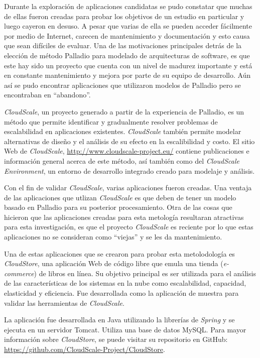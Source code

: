 \documentclass[11pt, twoside]{report}
\begin{document}
Durante la exploración de aplicaciones candidatas se pudo constatar que muchas de ellas fueron creadas para probar los objetivos de un estudio en particular y luego cayeron en desuso. A pesar que varias de ella se pueden acceder fácilmente por medio de Internet, carecen de mantenimiento y documentación y esto causa que sean difíciles de evaluar. Una de las motivaciones principales detrás de la elección de método Palladio para modelado de arquitecturas de software, es que este hay sido un proyecto que cuenta con un nivel de madurez importante y está en constante mantenimiento y mejora por parte de su equipo de desarrollo. Aún así se pudo encontrar aplicaciones que utilizaron modelos de Palladio pero se encontraban en ``abandono''. 

\emph{CloudScale}\cite{cloudscale-2}, un proyecto generado a partir de la experiencia de Palladio, es un método que permite identificar y gradualmente resolver problemas de escalabilidad en aplicaciones existentes. \emph{CloudScale} también permite modelar alternativas de diseño y el análisis de su efecto en la escalibilidad y costo\cite{cloudscale}. El sitio Web de \emph{CloudScale}, \url{http://www.cloudscale-project.eu/} contiene publicaciones e información general acerca de este método, así también como del \emph{CloudScale Environment}, un entorno de desarrollo integrado creado para modelaje y análisis. 

Con el fin de validar \emph{CloudScale}, varias aplicaciones fueron creadas. Una ventaja de las aplicaciones que utlizan \emph{CloudScale} es que deben de tener un modelo basado en Palladio para su posterior procesamiento. Otra de las cosas que hicieron que las aplicaciones creadas para esta metología resultaran atractivas para esta investigación, es que el proyecto \emph{CloudScale} es reciente por lo que estas aplicaciones no se consideran como ``viejas'' y se les da mantenimiento. 

Una de estas aplicaciones que se crearon para probar esta metolodología es \emph{CloudStore}, una aplicación Web de código libre que emula una tienda (\emph{e-commerce}) de libros en línea. Su objetivo principal es ser utilizada para el análisis de las características de los sistemas en la nube como escalabilidad, capacidad, elasticidad y eficiencia. Fue desarrollada como la aplicación de muestra para validar las herramientas de \emph{CloudScale}.

La aplicación fue desarrollada en Java utilizando la librerías de \emph{Spring} y se ejecuta en un servidor Tomcat. Utiliza una base de datos MySQL. Para mayor información sobre \emph{CloudStore}, se puede visitar su repositorio en GitHub: \url{https://github.com/CloudScale-Project/CloudStore}.
\end{document}

